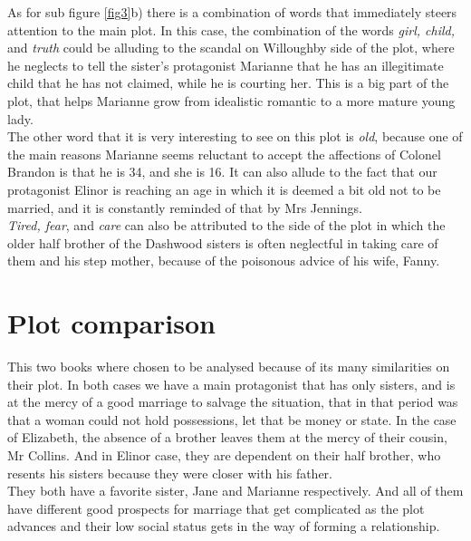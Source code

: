 \documentclass{article}
\begin{document}
As for sub figure \ref{fig3}b) there is a combination of words that immediately steers attention to the main plot. In this case, the combination of the words \textit{girl, child,} and \textit{truth} could be alluding to the scandal on Willoughby side of the plot, where he neglects to tell the sister's protagonist Marianne that he has an illegitimate child that he has not claimed, while he is courting her. This is a big part of the plot, that helps Marianne grow from 
idealistic romantic to a more mature young lady. \\

The other word that it is very interesting to see on this plot is \textit{old}, because one of the main reasons Marianne seems reluctant to accept the affections of Colonel Brandon is that he is 34, and she is 16. It can also allude to the fact that our protagonist Elinor is reaching an age in which it is deemed a bit old not to be married, and it is constantly reminded of that by Mrs Jennings.\\

\textit{Tired, fear}, and \textit{care} can also be attributed to the side of the plot in which the older half brother of the Dashwood sisters is often neglectful in taking care of them and his step mother, because of the poisonous advice of his wife, Fanny.\\

\section{Plot comparison}

This two books where chosen to be analysed because of its many similarities on their plot. In both cases we have a main protagonist that has only sisters, and is at the mercy of a good marriage to salvage the situation, that in that period was that a woman could not hold possessions, let that be money or state. In the case of Elizabeth, the absence of a brother leaves them at the mercy of their cousin, Mr Collins. And in Elinor case, they are dependent on their half brother, who resents his sisters because they were closer with his father. \\

They both have a favorite sister, Jane and Marianne respectively. And all of them have different good prospects for marriage that get complicated as the plot advances and their low social status gets in the way of forming a relationship.\\
\end{document}
